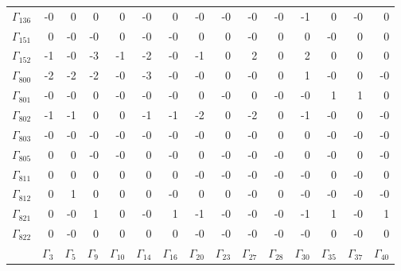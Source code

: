 {\begin{table}
\begin{center}
\begin{minipage}{\linewidth}
\begin{center}
\begin{envsmall}
\begin{center}
\begin{tabular}{rrrrrrrrrrrrrrr}
\( \Gamma_{136} \) &   -0 &    0 &    0 &    0 &   -0 &    0 &   -0 &   -0 &   -0 &   -0 &   -1 &    0 &   -0 &    0 \\
\( \Gamma_{151} \) &    0 &   -0 &   -0 &    0 &   -0 &   -0 &    0 &    0 &   -0 &    0 &    0 &   -0 &    0 &    0 \\
\( \Gamma_{152} \) &   -1 &   -0 &   -3 &   -1 &   -2 &   -0 &   -1 &    0 &    2 &    0 &    2 &    0 &    0 &    0 \\
\( \Gamma_{800} \) &   -2 &   -2 &   -2 &   -0 &   -3 &   -0 &   -0 &    0 &   -0 &    0 &    1 &   -0 &    0 &   -0 \\
\( \Gamma_{801} \) &   -0 &   -0 &    0 &   -0 &   -0 &   -0 &    0 &   -0 &    0 &   -0 &   -0 &    1 &    1 &    0 \\
\( \Gamma_{802} \) &   -1 &   -1 &    0 &    0 &   -1 &   -1 &   -2 &    0 &   -2 &    0 &   -1 &   -0 &    0 &   -0 \\
\( \Gamma_{803} \) &   -0 &   -0 &   -0 &   -0 &   -0 &   -0 &   -0 &    0 &   -0 &    0 &    0 &   -0 &   -0 &   -0 \\
\( \Gamma_{805} \) &    0 &    0 &   -0 &   -0 &    0 &   -0 &    0 &   -0 &   -0 &   -0 &    0 &   -0 &    0 &   -0 \\
\( \Gamma_{811} \) &    0 &    0 &    0 &    0 &    0 &    0 &   -0 &   -0 &   -0 &   -0 &   -0 &    0 &   -0 &    0 \\
\( \Gamma_{812} \) &    0 &    1 &    0 &    0 &    0 &   -0 &    0 &    0 &   -0 &    0 &   -0 &   -0 &   -0 &   -0 \\
\( \Gamma_{821} \) &    0 &   -0 &    1 &    0 &   -0 &    1 &   -1 &   -0 &   -0 &   -0 &   -1 &    1 &   -0 &    1 \\
\( \Gamma_{822} \) &    0 &   -0 &    0 &    0 &    0 &    0 &   -0 &   -0 &   -0 &   -0 &   -0 &    0 &   -0 &    0 \\
 & \( \Gamma_{3} \) & \( \Gamma_{5} \) & \( \Gamma_{9} \) & \( \Gamma_{10} \) & \( \Gamma_{14} \) & \( \Gamma_{16} \) & \( \Gamma_{20} \) & \( \Gamma_{23} \) & \( \Gamma_{27} \) & \( \Gamma_{28} \) & \( \Gamma_{30} \) & \( \Gamma_{35} \) & \( \Gamma_{37} \) & \( \Gamma_{40} \)
\\\hline
\end{tabular}
\end{center}
\end{envsmall}
\ifhevea\else
\end{center}
\end{minipage}
\fi
\end{center}
\ifhevea\end{table}\fi
}
